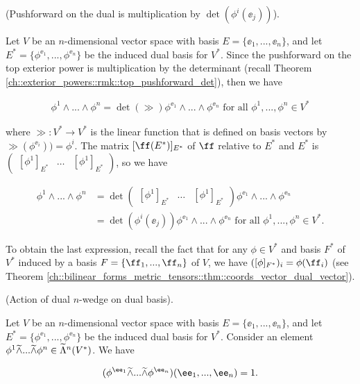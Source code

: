 \begin{lemma}
\label{ch::exterior_powers::lemma::pushforward_on_dual}

    (Pushforward on the dual is multiplication by $\det(\phi^i(\ee_j))$).
    
    Let $V$ be an $n$-dimensional vector space with basis $E = \{\ee_1, ..., \ee_n\}$, and let $E^* = \{\phi^{\ee_1}, ..., \phi^{\ee_n}\}$ be the induced dual basis for $V^*$. Since the pushforward on the top exterior power is multiplication by the determinant (recall Theorem \ref{ch::exterior_powers::rmk::top_pushforward_det}), then we have
    
    \begin{align*}
        \phi^1 \wedge ... \wedge \phi^n = \det(\gg) \phi^{\ee_1} \wedge ... \wedge \phi^{\ee_n}
        \text{ for all  $\phi^1, ..., \phi^n \in V^*$}
    \end{align*}

    where $\gg:V^* \rightarrow V^*$ is the linear function that is defined on basis vectors by $\gg(\phi^{\ee_i})) = \phi^i$. The matrix $[\ff(E^*)]_{E^*}$ of $\ff$ relative to $E^*$ and $E^*$ is $\begin{pmatrix} [\phi^1]_{E^*} & \hdots & [\phi^1]_{E^*} \end{pmatrix}$, so we have
    
    \begin{align*}
        \phi^1 \wedge ... \wedge \phi^n &= \det \begin{pmatrix} [\phi^1]_{E^*} & \hdots & [\phi^1]_{E^*} \end{pmatrix} \phi^{\ee_1} \wedge ... \wedge \phi^{\ee_n} \\
        &= \det(\phi^i(\ee_j)) \phi^{\ee_1} \wedge ... \wedge \phi^{\ee_n} \text{ for all $\phi^1, ..., \phi^n \in V^*$}.
    \end{align*}
    
    To obtain the last expression, recall the fact that for any $\phi \in V^*$ and basis $F^*$ of $V^*$ induced by a basis $F = \{\ff_1, ..., \ff_n\}$ of $V$, we have $([\phi]_{F^*})_i = \phi(\ff_i)$ (see Theorem \ref{ch::bilinear_forms_metric_tensors::thm::coords_vector_dual_vector}).
\end{lemma}

\begin{lemma}
\label{ch::exterior_powers::lemma::action_dual_wedge_dual_basis}
    (Action of dual $n$-wedge on dual basis).
    
    Let $V$ be an $n$-dimensional vector space with basis $E = \{\ee_1, ..., \ee_n\}$, and let $E^* = \{\phi^{\ee_1}, ..., \phi^{\ee_n}\}$ be the induced dual basis for $V^*$. Consider an element $\phi^1 \widetilde{\wedge} ... \widetilde{\wedge} \phi^n \in \widetilde{\Lambda}^n(V^*)$. We have
    
    \begin{align*}
        (\phi^{\ee_1} \twedge ... \twedge \phi^{\ee_n})(\ee_1, ..., \ee_n) = 1.
    \end{align*} 
\end{lemma}

